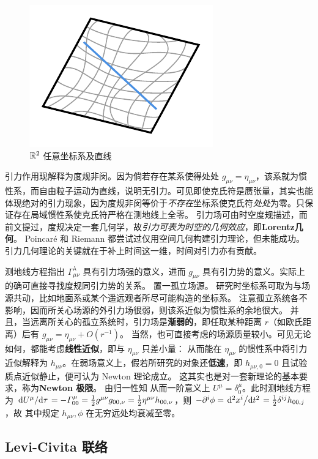 \begin{figure}[ht]
    \centering
\includegraphics[width=.4\textwidth]{fig/chpt01/geodesic.pdf}
    \caption{\small $\mathbb{R}^2$ 任意坐标系及直线}
\end{figure}

引力作用现解释为度规非闵。因为倘若存在某系使得处处 $g_{\mu\nu}=\eta_{\mu\nu}$，该系就为惯性系，而自由粒子运动为直线，说明无引力。可见即使克氏符是赝张量，其实也能体现绝对的引力现象，因为度规非闵等价于\textit{不存在}坐标系使克氏符\textit{处处}为零。只保证存在局域惯性系使克氏符严格在测地线上全零。
引力场可由时空度规描述，而前文提过，度规决定一套几何学，故\textit{引力可表为时空的几何效应}，即\textbf{Lorentz几何}。
Poincaré 和 Riemann 都尝试过仅用空间几何构建引力理论，但未能成功。引力几何理论的关键就在于补上时间这一维，时间对引力亦有贡献。

测地线方程指出 $\Gamma^{\lambda}_{\mu\nu}$ 具有引力场强的意义，进而 $g_{\mu\nu}$ 具有引力势的意义。实际上的确可直接寻找度规同引力势的关系。
置一孤立场源。
研究时坐标系可取为与场源共动，比如地面系或某个遥远观者所尽可能构造的坐标系。
注意孤立系统各不影响，因而所关心场源的外引力场很弱，则该系近似为惯性系的余地很大。
并且，当远离所关心的孤立系统时，引力场是\textbf{渐弱的}，即任取某种距离 $r$（如欧氏距离）后有 $g_{\mu\nu}=\eta_{\mu\nu}+O(r^{-1})$。
当然，也可直接考虑的场源质量较小。可见无论如何，都能考虑\textbf{线性近似}，即与 $\eta_{\mu\nu}$ 只差小量：
从而能在 $\eta_{\mu\nu}$ 的惯性系中将引力近似解释为 $h_{\mu\nu}$。在弱场意义上，假若所研究的对象还\textbf{低速}，即 $h_{\mu\nu,0}=0$ 且试验质点近似静止，便可认为 Newton 理论成立。
这其实也是对一套新理论的基本要求，称为\textbf{Newton 极限}。
由归一性知
从而一阶意义上 $U^\mu=\delta^\mu_0$。此时测地线方程为 $\dv*{U^\mu}{\tau}=-\Gamma_{00}^\mu= \frac 12 g^{\mu\nu} g_{00,\nu}=\frac 12 \eta^{\mu\nu} h_{00,\nu}$，则 $-\partial^i\phi=\dv*[2]{x^i}{t}=\frac 12 \delta^{ij} h_{00,j}$，故
其中规定 $h_{\mu\nu},\phi$ 在无穷远处均衰减至零。


\subsection{Levi-Civita 联络}\label{sec:co-di}


